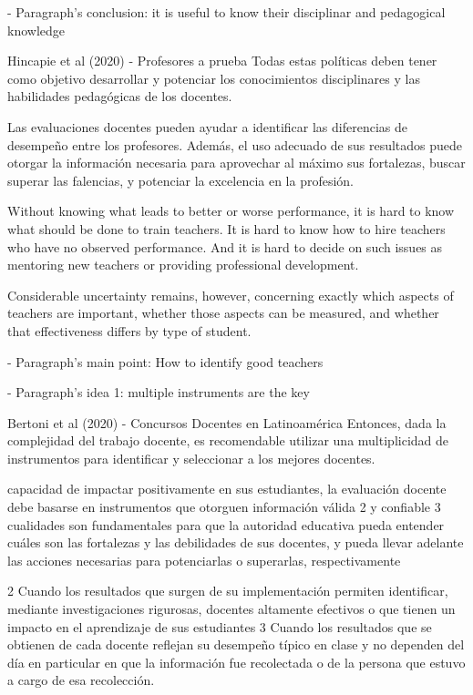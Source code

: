 - Paragraph's conclusion: it is useful to know their disciplinar and pedagogical knowledge 

Hincapie et al (2020) - Profesores a prueba
Todas estas políticas deben tener como objetivo desarrollar y potenciar los conocimientos disciplinares y las habilidades pedagógicas de los docentes. 

Las evaluaciones docentes pueden ayudar a identificar las diferencias de desempeño entre los profesores. Además, el uso adecuado de sus resultados puede otorgar la información necesaria para aprovechar al máximo sus fortalezas, buscar superar las falencias, y potenciar la excelencia en la profesión.

Without knowing what leads to better or worse performance, it is hard to know what should be done to train teachers. It is hard to know how to hire teachers who have no observed performance. And it is hard to decide on such issues as mentoring new teachers or providing professional development. \citep{Hanushek_et_al_2012}



Considerable uncertainty remains, however, concerning exactly which aspects of teachers are important, whether those aspects can be measured, and whether that effectiveness differs by type of student. \citep{Clotfelter_et_al_2006}




- Paragraph's main point: How to identify good teachers

- Paragraph's idea 1: multiple instruments are the key

Bertoni et al (2020) - Concursos Docentes en Latinoamérica
Entonces, dada la complejidad del trabajo docente, es recomendable utilizar una multiplicidad de instrumentos para identificar y seleccionar a los mejores docentes.

capacidad de impactar positivamente en sus estudiantes, la evaluación docente debe basarse en
instrumentos que otorguen información válida 2 y confiable 3 cualidades son fundamentales para que la autoridad educativa pueda entender cuáles son las fortalezas y las debilidades de sus docentes, y pueda llevar adelante las acciones necesarias para potenciarlas o superarlas, respectivamente

2 Cuando los resultados que surgen de su implementación permiten identificar, mediante investigaciones rigurosas, docentes altamente efectivos o que tienen un impacto en el aprendizaje de sus estudiantes
3 Cuando los resultados que se obtienen de cada docente reflejan su desempeño típico en clase y no dependen del día en particular en que la información fue recolectada o de la persona que estuvo a cargo de esa recolección.


